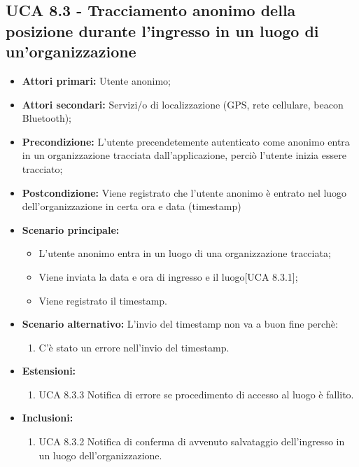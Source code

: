 \subsection{UCA 8.3 - Tracciamento anonimo della posizione durante l'ingresso in un luogo di un'organizzazione}%
\begin{itemize}
	\item \textbf{Attori primari:} Utente anonimo; 
	\item \textbf{Attori secondari:} Servizi/o di localizzazione (GPS, rete cellulare, beacon Bluetooth);
	\item \textbf{Precondizione:} L'utente precendetemente autenticato come anonimo entra in un organizzazione tracciata dall'applicazione, perciò l'utente inizia essere tracciato;
	\item \textbf{Postcondizione:} Viene registrato che l'utente anonimo è entrato nel luogo dell'organizzazione in certa ora e data (timestamp)
	\item \textbf{Scenario principale:}
	\begin{itemize}
		\item L'utente anonimo entra in un luogo di una organizzazione tracciata;
		\item Viene inviata la data e ora di ingresso e il luogo[UCA 8.3.1];
		\item Viene registrato il timestamp.
	\end{itemize}
	\item \textbf{Scenario alternativo:} L'invio del timestamp non va a buon fine perchè:
	\begin{enumerate}
		\item C'è stato un errore nell'invio del timestamp.
	\end{enumerate}
	\item \textbf{Estensioni:}
	\begin{enumerate}
		\item UCA 8.3.3 Notifica di errore se procedimento di accesso al luogo è fallito.
	\end{enumerate}
	\item \textbf{Inclusioni:}
	\begin{enumerate}
		\item UCA 8.3.2 Notifica di conferma di avvenuto salvataggio dell'ingresso in un luogo dell'organizzazione.
	\end{enumerate}
\end{itemize}

